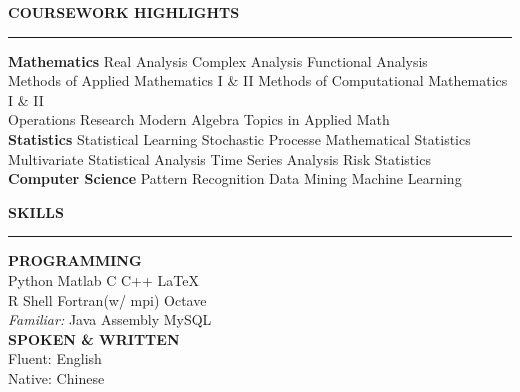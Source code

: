 \documentclass[UTF8,A4]{ctexart}
\newcommand{\cvsection}[1]
{
	\begin{center}
		\large\textcolor{sectcol}{\textbf{#1}}
	\end{center}
}
\begin{document}
\newpage


\cvsection{COURSEWORK HIGHLIGHTS}
\vspace{-18pt}
\textcolor{softcol}{\hrule}
\vspace{6pt}

\textbf{Mathematics}
Real Analysis \textbullet{} Complex Analysis \textbullet{} Functional Analysis \\
Methods of Applied Mathematics I \& II \textbullet{} Methods of Computational Mathematics I \& II \\
Operations Research \textbullet{} Modern Algebra \textbullet{} Topics in Applied Math\\

\textbf{Statistics}
Statistical Learning \textbullet{} Stochastic Processe \textbullet{} Mathematical Statistics \\
Multivariate Statistical Analysis \textbullet{} Time Series Analysis \textbullet{} Risk Statistics\\

\textbf{Computer Science}
Pattern Recognition \textbullet{} Data Mining \textbullet{} Machine Learning\\


\cvsection{SKILLS}
\vspace{-18pt}
\textcolor{softcol}{\hrule}
\vspace{6pt}

\textbf{PROGRAMMING}\\
Python \textbullet{} Matlab \textbullet{} C \textbullet{} C++ \textbullet{} \LaTeX\ \\
R \textbullet{} Shell \textbullet{} Fortran(w/ mpi) \textbullet{} Octave\\
\textit{Familiar:}
Java \textbullet{} Assembly \textbullet{} MySQL\\

\textbf{SPOKEN \& WRITTEN}\\
Fluent: English \\
Native: Chinese\\
\end{document}
